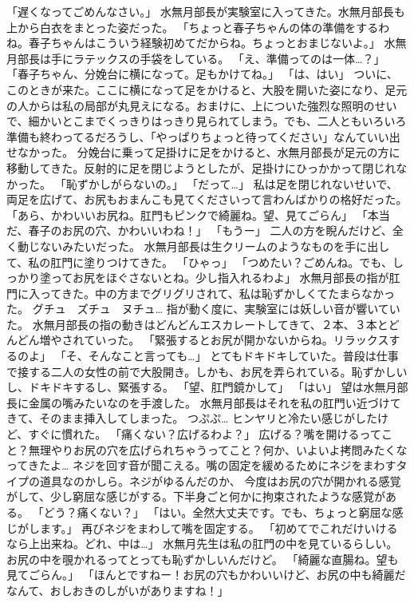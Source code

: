 「遅くなってごめんなさい。」
水無月部長が実験室に入ってきた。水無月部長も上から白衣をまとった姿だった。
「ちょっと春子ちゃんの体の準備をするわね。春子ちゃんはこういう経験初めてだからね。ちょっとおまじないよ。」
水無月部長は手にラテックスの手袋をしている。
「え、準備ってのは一体…？」
「春子ちゃん、分娩台に横になって。足もかけてね。」
「は、はい」
ついに、このときが来た。ここに横になって足をかけると、大股を開いた姿になり、足元の人からは私の局部が丸見えになる。おまけに、上についた強烈な照明のせいで、細かいとこまでくっきりはっきり見られてしまう。でも、二人ともいろいろ準備も終わってるだろうし、「やっぱりちょっと待ってください」なんていい出せなかった。
分娩台に乗って足掛けに足をかけると、水無月部長が足元の方に移動してきた。反射的に足を閉じようとしたが、足掛けにひっかかって閉じれなかった。
「恥ずかしがらないの。」
「だって…」
私は足を閉じれないせいで、両足を広げて、お尻もおまんこも見てくださいって言わんばかりの格好だった。
「あら、かわいいお尻ね。肛門もピンクで綺麗ね。望、見てごらん」
「本当だ、春子のお尻の穴、かわいいわね！」
「もうー」
二人の方を睨んだけど、全く動じないみたいだった。
水無月部長は生クリームのようなものを手に出して、私の肛門に塗りつけてきた。
「ひゃっ」
「つめたい？ごめんね。でも、しっかり塗ってお尻をほぐさないとね。少し指入れるわよ」
水無月部長の指が肛門に入ってきた。中の方までグリグリされて、私は恥ずかしくてたまらなかった。
グチュ　ズチュ　ヌチュ…
指が動く度に、実験室には妖しい音が響いていた。
水無月部長の指の動きはどんどんエスカレートしてきて、２本、３本とどんどん増やされていった。
「緊張するとお尻が開かないからね。リラックスするのよ」
「そ、そんなこと言っても…」
とてもドキドキしていた。普段は仕事で接する二人の女性の前で大股開き。しかも、お尻を弄られている。恥ずかしいし、ドキドキするし、緊張する。
「望、肛門鏡かして」
「はい」
望は水無月部長に金属の嘴みたいなのを手渡した。
水無月部長はそれを私の肛門い近づけてきて、そのまま挿入してしまった。
つぷぷ…
ヒンヤリと冷たい感じがしたけど、すぐに慣れた。
「痛くない？広げるわよ？」
広げる？嘴を開けるってこと？無理やりお尻の穴を広げられちゃうってこと？何か、いよいよ拷問みたくなってきたよ…
ネジを回す音が聞こえる。嘴の固定を緩めるためにネジをまわすタイプの道具なのかしら。ネジがゆるんだのか、
今度はお尻の穴が開かれる感覚がして、少し窮屈な感じがする。下半身ごと何かに拘束されたような感覚がある。
「どう？痛くない？」
「はい。全然大丈夫です。でも、ちょっと窮屈な感じがします。」
再びネジをまわして嘴を固定する。
「初めてでこれだけいけるなら上出来ね。どれ、中は…」
水無月先生は私の肛門の中を見ているらしい。お尻の中を覗かれるってとっても恥ずかしいんだけど。
「綺麗な直腸ね。望も見てごらん。」
「ほんとですねー！お尻の穴もかわいいけど、お尻の中も綺麗だなんて、おしおきのしがいがありますね！」
